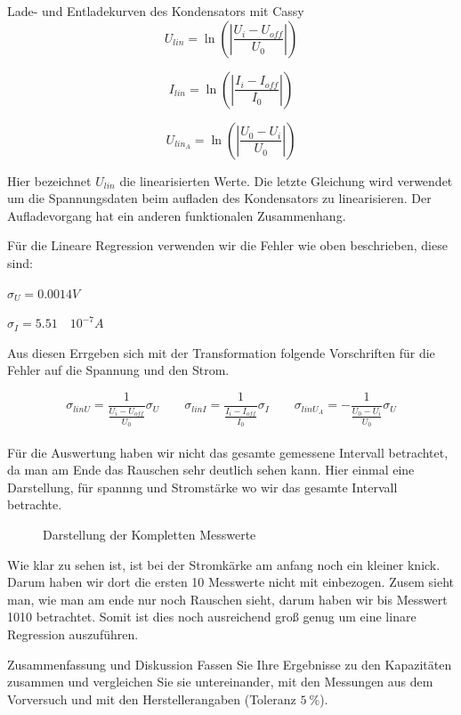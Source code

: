 \documentclass[twoside]{protokoll}
\begin{document}
\begin{aufgabe}{Lade- und Entladekurven des Kondensators mit Cassy}
\begin{equation}
 U_{lin} = \ln\left(\left|\frac{U_i - U_{off}}{U_0}\right|\right)
\end{equation}


\begin{equation}
 I_{lin} = \ln\left(\left|\frac{I_i - I_{off}}{I_0}\right|\right)
\end{equation}

\begin{equation}
 U_{lin_A} = \ln\left(\left|\frac{U_0 - U_i}{U_0}\right|\right)
\end{equation}

Hier bezeichnet $U_{lin}$ die linearisierten Werte. Die letzte Gleichung wird verwendet um die Spannungsdaten beim aufladen des Kondensators zu linearisieren. 
Der Aufladevorgang hat ein anderen funktionalen Zusammenhang.

Für die Lineare Regression verwenden wir die Fehler wie oben beschrieben, diese sind:

$\sigma_U = 0.0014 V $

$\sigma_I = 5.51 \quad 10^{-7} A $

Aus diesen Errgeben sich mit der Transformation folgende Vorschriften für die Fehler auf die Spannung und den Strom.

\begin{equation}
	\sigma_{lin U} = \frac{1}{\frac{U_i - U_{off}}{U_0}} \sigma_U \qquad
	\sigma_{lin I} = \frac{1}{\frac{I_i - I_{off}}{I_0}} \sigma_I \qquad
	\sigma_{lin U_A} = -\frac{1}{\frac{U_0 - U_i}{U_0}} \sigma_U
\end{equation}\\
 
Für die Auswertung haben wir nicht das gesamte gemessene Intervall betrachtet, da man am Ende das Rauschen sehr deutlich sehen kann.
Hier einmal eine Darstellung, für spannng und Stromstärke wo wir das gesamte Intervall betrachte.
\begin{figure}[H]
    \centering
    \hfill
    \caption{Darstellung der Kompletten Messwerte}
    \centering
\end{figure}
Wie klar zu sehen ist, ist bei der Stromkärke am anfang noch ein kleiner knick.
Darum haben wir dort die ersten 10 Messwerte nicht mit einbezogen.
Zusem sieht man, wie man am ende nur noch Rauschen sieht, darum haben wir bis Messwert 1010 betrachtet.
Somit ist dies noch ausreichend groß genug um eine linare Regression auszuführen.
 


\end{aufgabe}

\begin{aufgabe}{Zusammenfassung und Diskussion}
  Fassen Sie Ihre Ergebnisse zu den Kapazitäten zusammen und
  vergleichen Sie sie untereinander, mit den Messungen aus dem
  Vorversuch und mit den Herstellerangaben (Toleranz
  $\SI{5}{\percent}$).  

\end{aufgabe}
 
\end{document}
